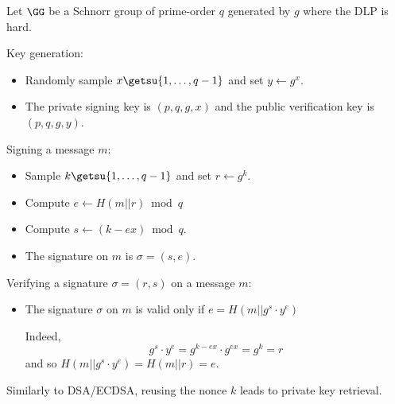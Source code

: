 \documentclass{practice}
\begin{document}
\begin{tcolorbox}[title=Schnorr signature]
  Let $\GG$ be a Schnorr group of prime-order $q$ generated by $g$ where the DLP is hard.

  Key generation:
  \begin{itemize}
    \item Randomly sample $x \getsu \{1, \dots, q-1\}$ and set $y \gets g^{x}$.
    \item The private signing key is $(p, q, g, x)$ and the public verification key is $(p, q, g, y)$.
  \end{itemize}

  Signing a message $m$:
  \begin{itemize}
    \item Sample $k \getsu\{1, \dots, q-1\}$ and set $r \gets g^k$.
    \item Compute $e \gets H(m||r) \bmod{q}$
    \item Compute $s \gets (k - ex) \bmod{q}$.
    \item The signature on $m$ is $\sigma = (s, e)$.
  \end{itemize}

  Verifying a signature $\sigma = (r, s)$ on a message $m$:
  \begin{itemize}
    \item The signature $\sigma$ on $m$ is valid only if $e = H(m||g^s \cdot y^e)$
    
    Indeed,
    \[
      g^s \cdot y^e = g^{k - ex} \cdot g^{ex} = g^k = r
    \]
    and so $H(m||g^s\cdot y^e) = H(m||r) = e$.
  \end{itemize}
  \tcblower
  Similarly to DSA/ECDSA, reusing the nonce $k$ leads to private key retrieval.
\end{tcolorbox}
\end{document}
